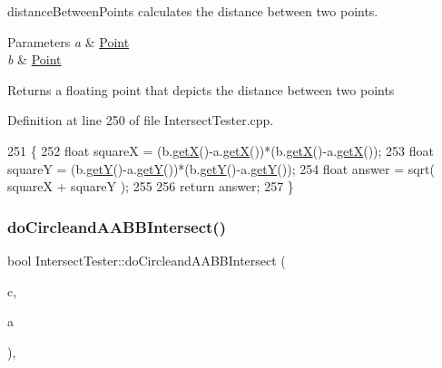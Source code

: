 distance\+Between\+Points calculates the distance between two points. 


\begin{DoxyParams}{Parameters}
{\em a} & \hyperlink{class_point}{Point} \\
\hline
{\em b} & \hyperlink{class_point}{Point} \\
\hline
\end{DoxyParams}
\begin{DoxyReturn}{Returns}
a floating point that depicts the distance between two points 
\end{DoxyReturn}


Definition at line 250 of file Intersect\+Tester.\+cpp.


\begin{DoxyCode}
251 \{
252     \textcolor{keywordtype}{float} squareX = (b.\hyperlink{class_point_a29c44ec7c7279e02629645a06cdaf7d5}{getX}()-a.\hyperlink{class_point_a29c44ec7c7279e02629645a06cdaf7d5}{getX}())*(b.\hyperlink{class_point_a29c44ec7c7279e02629645a06cdaf7d5}{getX}()-a.\hyperlink{class_point_a29c44ec7c7279e02629645a06cdaf7d5}{getX}());
253     \textcolor{keywordtype}{float} squareY = (b.\hyperlink{class_point_a2371ffadbe245d12a8f556d0a976521b}{getY}()-a.\hyperlink{class_point_a2371ffadbe245d12a8f556d0a976521b}{getY}())*(b.\hyperlink{class_point_a2371ffadbe245d12a8f556d0a976521b}{getY}()-a.\hyperlink{class_point_a2371ffadbe245d12a8f556d0a976521b}{getY}());
254     \textcolor{keywordtype}{float} answer = sqrt( squareX + squareY );
255 
256      \textcolor{keywordflow}{return} answer;
257 \}
\end{DoxyCode}
\mbox{\label{class_intersect_tester_af76b72861b57c630e7c54ad9449a2d27}} 
\subsubsection{\texorpdfstring{do\+Circleand\+A\+A\+B\+B\+Intersect()}{doCircleandAABBIntersect()}}
{\footnotesize\ttfamily bool Intersect\+Tester\+::do\+Circleand\+A\+A\+B\+B\+Intersect (\begin{DoxyParamCaption}\item[{\hyperlink{class_circle}{Circle}}]{c,  }\item[{\hyperlink{class_a_a_b_b}{A\+A\+BB}}]{a }\end{DoxyParamCaption})\hspace{0.3cm}{\ttfamily [static]}, {\ttfamily [private]}}



